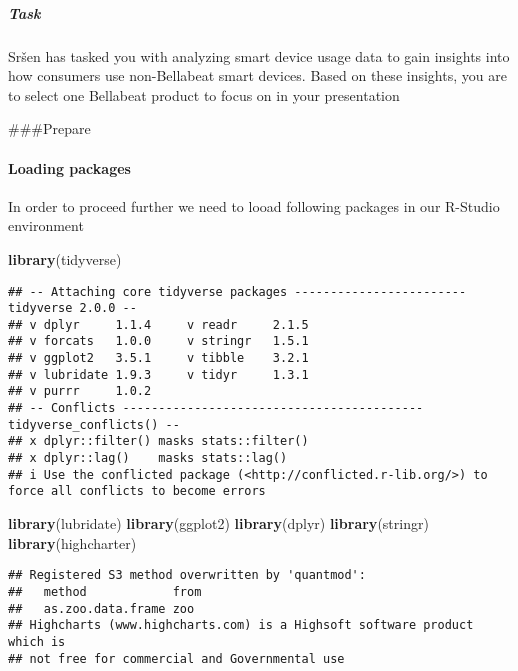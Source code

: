 \documentclass[
]{article}
\newenvironment{Shaded}{\begin{snugshade}}{\end{snugshade}}
\newcommand{\FunctionTok}[1]{\textcolor[rgb]{0.13,0.29,0.53}{\textbf{#1}}}
\newcommand{\NormalTok}[1]{#1}
\begin{document}
\subparagraph{Task}\label{task}

Sršen has tasked you with analyzing smart device usage data to gain
insights into how consumers use non-Bellabeat smart devices. Based on
these insights, you are to select one Bellabeat product to focus on in
your presentation

\#\#\#Prepare

\paragraph{Loading packages}\label{loading-packages}

In order to proceed further we need to looad following packages in our
R-Studio environment

\begin{Shaded}
\begin{Highlighting}[]
\FunctionTok{library}\NormalTok{(tidyverse)}
\end{Highlighting}
\end{Shaded}

\begin{verbatim}
## -- Attaching core tidyverse packages ------------------------ tidyverse 2.0.0 --
## v dplyr     1.1.4     v readr     2.1.5
## v forcats   1.0.0     v stringr   1.5.1
## v ggplot2   3.5.1     v tibble    3.2.1
## v lubridate 1.9.3     v tidyr     1.3.1
## v purrr     1.0.2     
## -- Conflicts ------------------------------------------ tidyverse_conflicts() --
## x dplyr::filter() masks stats::filter()
## x dplyr::lag()    masks stats::lag()
## i Use the conflicted package (<http://conflicted.r-lib.org/>) to force all conflicts to become errors
\end{verbatim}

\begin{Shaded}
\begin{Highlighting}[]
\FunctionTok{library}\NormalTok{(lubridate)}
\FunctionTok{library}\NormalTok{(ggplot2)}
\FunctionTok{library}\NormalTok{(dplyr)}
\FunctionTok{library}\NormalTok{(stringr)}
\FunctionTok{library}\NormalTok{(highcharter)}
\end{Highlighting}
\end{Shaded}

\begin{verbatim}
## Registered S3 method overwritten by 'quantmod':
##   method            from
##   as.zoo.data.frame zoo 
## Highcharts (www.highcharts.com) is a Highsoft software product which is
## not free for commercial and Governmental use
\end{verbatim}
\end{document}
